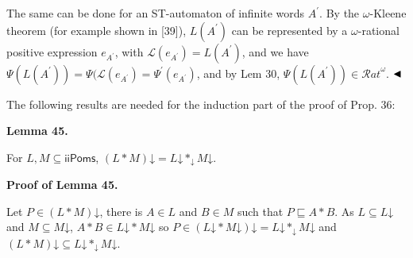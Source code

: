 \documentclass[10pt,a4paper]{article}
\begin{document}
 
 
The same can be done for an ST-automaton of infinite words $A^{\prime}$. By the $\omega$-Kleene theorem (for example shown in [39]), $L(A^{\prime})$ can be represented by a $\omega$-rational positive expression $e_{A^{\prime}}$, with $\mathcal{L}(e_{A^{\prime}})=L(A^{\prime})$, and we have $\Psi(L(A^{\prime}))=\Psi(\mathcal{L}(e_{A^{\prime}})=\Psi^{\prime}(e_{A^{\prime}})$, and by Lem 30, $\Psi(L(A^{\prime}))\in{\mathcal{R}at}^{\omega}$. $\hfill\blacktriangleleft$\par
 
 
 
The following results are needed for the induction part of the proof of Prop. 36:\par
 
 
 
\par\medskip\noindent\textbf{Lemma 45.}\par
 
 
For $L,M\subseteq\mathsf{iiPoms}$, $(L*M)\mathord{\downarrow}=L\mathord{\downarrow}*_{\mathord{\downarrow}}M\mathord{\downarrow}$.\par
 
 
 
 
 
\par\medskip\noindent\textbf{Proof of Lemma 45.}\par
 
 
Let $P\in(L*M)\mathord{\downarrow}$, there is $A\in L$ and $B\in M$ such that $P\sqsubseteq A*B$. As $L\subseteq L\mathord{\downarrow}$ and $M\subseteq M\mathord{\downarrow}$, $A*B\in L\mathord{\downarrow}*M\mathord{\downarrow}$ so $P\in(L\mathord{\downarrow}*M\mathord{\downarrow})\mathord{\downarrow}=L\mathord{\downarrow}*_{\mathord{\downarrow}}M\mathord{\downarrow}$ and $(L*M)\mathord{\downarrow}\subseteq L\mathord{\downarrow}*_{\mathord{\downarrow}}M\mathord{\downarrow}$.\par
 
\end{document}
